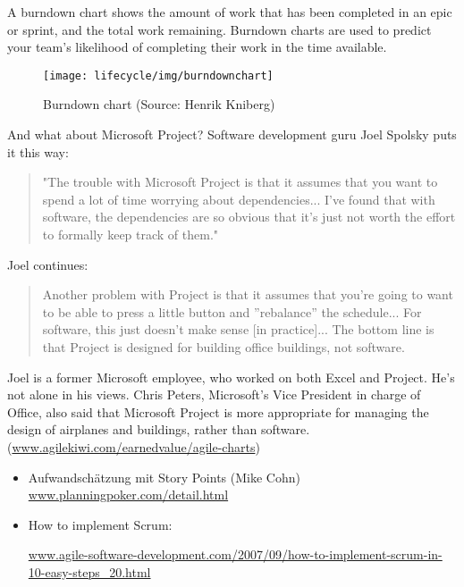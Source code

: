 A burndown chart shows the amount of work that has been
completed in an epic or sprint, and the total work remaining.
Burndown charts are used to predict your team's likelihood of
completing their work in the time available.
\begin{figure}[H]
\centering
\texttt{[image: lifecycle/img/burndownchart]}
\caption{Burndown chart (Source: Henrik Kniberg)}
\end{figure}
\newslide
%
And what about Microsoft Project?
Software development guru Joel Spolsky puts it this way:
\begin{quote}
"The trouble with Microsoft Project is that it assumes that you want
to spend a lot of time worrying about dependencies... I've found that
with software, the dependencies are so obvious that it's just not
worth the effort to formally keep track of them."
\end{quote}
Joel continues:
\begin{quote}
Another problem with Project is that it assumes that you're going to
want to be able to press a little button and ''rebalance'' the
schedule... For software, this just doesn't make sense [in
practice]... The bottom line is that Project is designed for building
office buildings, not software.
\end{quote}
Joel is a former Microsoft employee, who worked on both Excel and
Project.  He's not alone in his views. Chris Peters, Microsoft's Vice
President in charge of Office, also said that Microsoft Project is
more appropriate for managing the design of airplanes and buildings,
rather than
software. (\href{http://www.agilekiwi.com/earnedvalue/agile-charts}
{www.agilekiwi.com/earnedvalue/agile-charts})
%
\begin{itemize}
\item Aufwandschätzung mit Story Points (Mike Cohn)
\href{http://www.planningpoker.com/detail.html}
{www.planningpoker.com/detail.html}
\item How to implement Scrum:

\href{http://www.agile-software-development.com/2007/09/how-to-implement-scrum-in-10-easy-steps_20.html}{www.agile-software-development.com/2007/09/how-to-implement-scrum-in-10-easy-steps\_20.html}
\end{itemize}
%
\newpage
